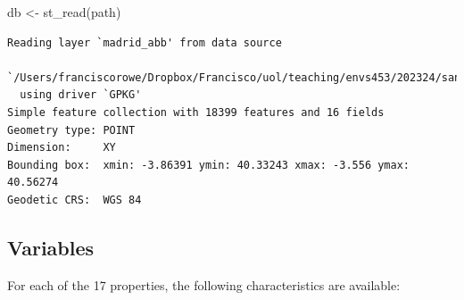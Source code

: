 \documentclass[
  letterpaper,
  DIV=11,
  numbers=noendperiod,
  oneside]{scrreprt}
\newenvironment{Shaded}{\begin{snugshade}}{\end{snugshade}}
\newcommand{\FunctionTok}[1]{\textcolor[rgb]{0.28,0.35,0.67}{#1}}
\newcommand{\NormalTok}[1]{\textcolor[rgb]{0.00,0.23,0.31}{#1}}
\newcommand{\OtherTok}[1]{\textcolor[rgb]{0.00,0.23,0.31}{#1}}
\begin{document}
\begin{Shaded}
\begin{Highlighting}[]
\NormalTok{db }\OtherTok{\textless{}{-}} \FunctionTok{st\_read}\NormalTok{(path)}
\end{Highlighting}
\end{Shaded}

\begin{verbatim}
Reading layer `madrid_abb' from data source 
  `/Users/franciscorowe/Dropbox/Francisco/uol/teaching/envs453/202324/san/data/assignment_1_madrid/madrid_abb.gpkg' 
  using driver `GPKG'
Simple feature collection with 18399 features and 16 fields
Geometry type: POINT
Dimension:     XY
Bounding box:  xmin: -3.86391 ymin: 40.33243 xmax: -3.556 ymax: 40.56274
Geodetic CRS:  WGS 84
\end{verbatim}

\subsection*{Variables}\label{variables}

For each of the 17 properties, the following characteristics are
available:
\end{document}
